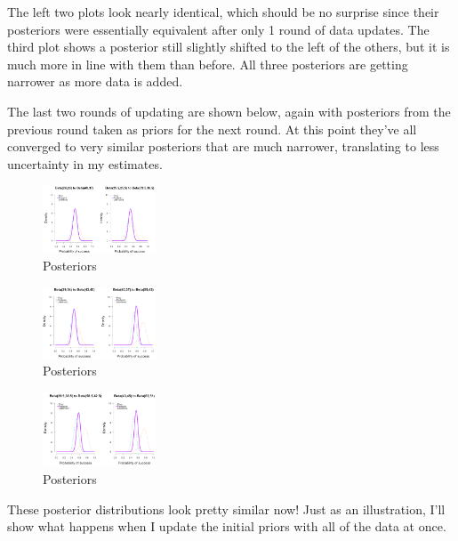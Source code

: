 The left two plots look nearly identical, which should be no surprise since their posteriors were essentially equivalent after only 1 round of data updates. The third plot shows a posterior still slightly shifted to the left of the others, but it is much more in line with them than before. All three posteriors are getting narrower as more data is added.

The last two rounds of updating are shown below, again with posteriors from the previous round taken as priors for the next round. At this point they've all converged to very similar posteriors that are much narrower, translating to less uncertainty in my estimates.


\begin{figure}[h]
    \centering
\includegraphics[width=0.3\textwidth]{pic/p05c03-snip09.png}
    \caption{Posteriors}
    \label{fig:p05c03-snip09}
\end{figure}

\begin{figure}[h]
    \centering
\includegraphics[width=0.3\textwidth]{pic/p05c03-snip10.png}
    \caption{Posteriors}
    \label{fig:p05c03-snip10}
\end{figure}

\begin{figure}[h]
    \centering
\includegraphics[width=0.3\textwidth]{pic/p05c03-snip11.png}
    \caption{Posteriors}
    \label{fig:p05c03-snip11}
\end{figure}


These posterior distributions look pretty similar now! Just as an illustration, I'll show what happens when I update the initial priors with all of the data at once.


